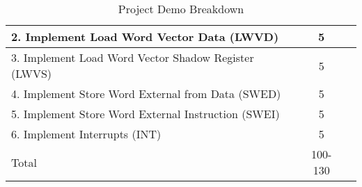 \documentclass{article}
\begin{document}
\begin{table}[!htb]
\begin{center}
\begin{tabular}[width=0.9\textwidth]{|l|c|l|}
       \hline
       2. Implement Load Word Vector Data  (LWVD) & 5 &\\
       \hline
       3. Implement Load Word Vector Shadow Register (LWVS) & 5 &\\
       \hline
       4. Implement Store Word External from Data (SWED) & 5 &\\
       \hline
       5. Implement Store Word External Instruction (SWEI) & 5 &\\
       \hline
       6. Implement Interrupts (INT) & 5 &\\
       \hline
       \hline
       \multicolumn{1}{|l}{Total} & \multicolumn{1}{c|}{100-130} &\\
       \hline
    \end{tabular}
  \end{center}
  \caption{Project Demo Breakdown}
  \label{tab:grade}
\end{table}
\end{document}
